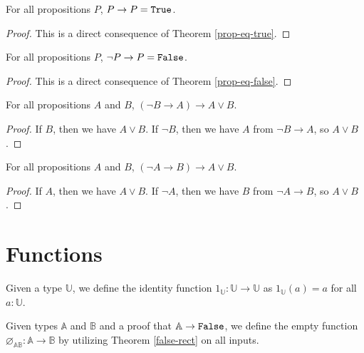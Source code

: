 \documentclass[../math.tex]{subfiles}
\begin{document}
\begin{theorem} \label{prop-is-true}
    For all propositions $P$, $P \to P = \verb|True|$.
\end{theorem}
\begin{proof}
    This is a direct consequence of Theorem \ref{prop-eq-true}.
\end{proof}

\begin{theorem} \label{prop-is-false}
    For all propositions $P$, $\neg P \to P = \verb|False|$.
\end{theorem}
\begin{proof}
    This is a direct consequence of Theorem \ref{prop-eq-false}.
\end{proof}

\begin{theorem} \label{or-left}
    For all propositions $A$ and $B$, $(\neg B \to A) \to A \vee B$.
\end{theorem}
\begin{proof}
    If $B$, then we have $A \vee B$.  If $\neg B$, then we have $A$ from $\neg B
    \to A$, so $A \vee B$.
\end{proof}

\begin{theorem} \label{or-right}
    For all propositions $A$ and $B$, $(\neg A \to B) \to A \vee B$.
\end{theorem}
\begin{proof}
    If $A$, then we have $A \vee B$.  If $\neg A$, then we have $B$ from $\neg A
    \to B$, so $A \vee B$.
\end{proof}

\section{Functions}

\begin{definition}
    Given a type $\mathbb U$, we define the identity function $1_\mathbb U :
    \mathbb U \rightarrow \mathbb U$ as $1_\mathbb U(a) = a$ for all $a :
    \mathbb U$.
\end{definition}

\begin{definition}
    Given types $\mathbb A$ and $\mathbb B$ and a proof that $\mathbb A
    \rightarrow \vtt{False}$, we define the empty function $\varnothing_{\mathbb
    A \mathbb B} : \mathbb A \rightarrow \mathbb B$ by utilizing Theorem
    \ref{false-rect} on all inputs.
\end{definition}
\end{document}
